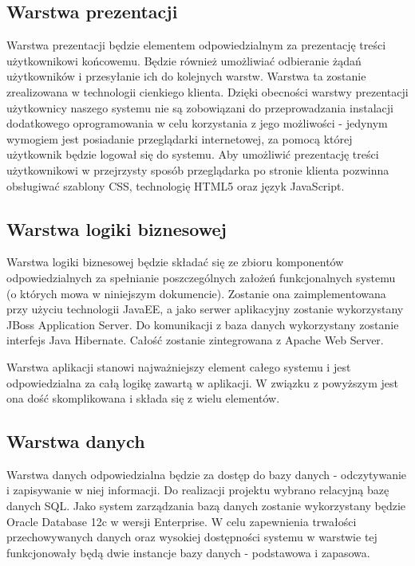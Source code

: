 \subsection{Warstwa prezentacji}

Warstwa prezentacji będzie elementem odpowiedzialnym za prezentację
treści użytkownikowi końcowemu. Będzie również umożliwiać odbieranie
żądań użytkowników i przesyłanie ich do kolejnych warstw. Warstwa ta
zostanie zrealizowana w technologii cienkiego klienta. Dzięki
obecności warstwy prezentacji użytkownicy naszego systemu nie są
zobowiązani do przeprowadzania instalacji dodatkowego oprogramowania w
celu korzystania z jego możliwości - jedynym wymogiem jest posiadanie
przeglądarki internetowej, za pomocą której użytkownik będzie logował
się do systemu. Aby umożliwić prezentację treści użytkownikowi w
przejrzysty sposób przeglądarka po stronie klienta pozwinna obsługiwać
szablony CSS, technologię HTML5 oraz język JavaScript.

\subsection{Warstwa logiki biznesowej}

Warstwa logiki biznesowej będzie składać się ze zbioru komponentów
odpowiedzialnych za spełnianie poszczególnych założeń funkcjonalnych
systemu (o których mowa w niniejszym dokumencie). Zostanie ona
zaimplementowana przy użyciu technologii JavaEE, a jako serwer
aplikacyjny zostanie wykorzystany JBoss Application Server. Do
komunikacji z baza danych wykorzystany zostanie interfejs Java
Hibernate. Całość zostanie zintegrowana z Apache Web Server.

Warstwa aplikacji stanowi najważniejszy element całego systemu i jest
odpowiedzialna za całą logikę zawartą w aplikacji. W związku z
powyższym jest ona dość skomplikowana i składa się z wielu elementów.

\subsection{Warstwa danych}

Warstwa danych odpowiedzialna będzie za dostęp do bazy danych -
odczytywanie i zapisywanie w niej informacji. Do realizacji projektu
wybrano relacyjną bazę danych SQL. Jako system zarządzania bazą danych
zostanie wykorzystany będzie Oracle Database 12c w wersji
Enterprise. W celu zapewnienia trwałości przechowywanych danych oraz
wysokiej dostępności systemu w warstwie tej funkcjonowały będą dwie
instancje bazy danych - podstawowa i zapasowa.


